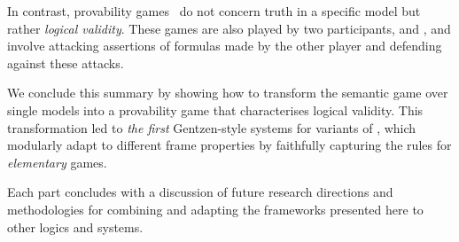 In contrast, provability games~\cite{Lorenzen1978-LORDLJ-2} do not concern truth in a specific model but rather {\em logical validity}. These games are also played by two participants, \Me and \You, and involve attacking assertions of formulas made by the other player and defending against these attacks.

We conclude this summary by showing how to transform the semantic game over single models into a provability game that characterises logical validity. This transformation led to {\em the first} Gentzen-style systems for variants of \PNL, which modularly adapt to different frame properties by faithfully capturing the rules for \emph{elementary} games. 

Each part concludes with a discussion of future research directions and methodologies for combining and adapting the frameworks presented here to other logics and systems.
